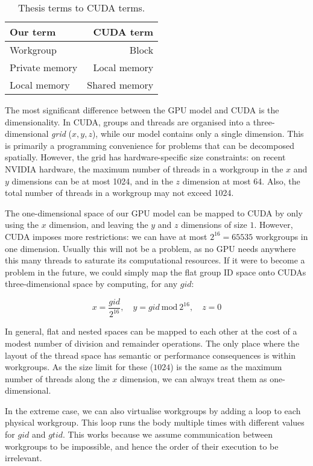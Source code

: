 \begin{table}
  \centering
  \begin{tabular}{l|r}
    \textbf{Our term} & \textbf{CUDA term} \\\hline
    Workgroup & Block \\
    Private memory & Local memory \\
    Local memory & Shared memory
  \end{tabular}
  \caption{Thesis terms to CUDA terms.}
  \label{tab:cuda-terms}
\end{table}

The most significant difference between the GPU model and CUDA is the
dimensionality.  In CUDA, groups and threads are organised into a
three-dimensional \textit{grid} ($x,y,z$), while our model contains
only a single dimension.  This is primarily a programming convenience
for problems that can be decomposed spatially.  However, the grid has
hardware-specific size constraints: on recent NVIDIA hardware, the
maximum number of threads in a workgroup in the $x$ and $y$ dimensions
can be at most 1024, and in the $z$ dimension at most 64.  Also, the
total number of threads in a workgroup may not exceed 1024.

The one-dimensional space of our GPU model can be mapped to CUDA by
only using the $x$ dimension, and leaving the $y$ and $z$ dimensions
of size $1$.  However, CUDA imposes more restrictions: we can have at
most $2^{16}=65535$ workgroups in one dimension.  Usually this will
not be a problem, as no GPU needs anywhere this many threads to
saturate its computational resources.  If it were to become a problem
in the future, we could simply map the flat group ID space onto CUDAs
three-dimensional space by computing, for any $gid$:

\[
x = \frac{gid}{2^{16}},\quad y = gid\ \text{mod}\ 2^{16}, \quad z = 0
\]

In general, flat and nested spaces can be mapped to each other at the
cost of a modest number of division and remainder operations.  The
only place where the layout of the thread space has semantic or
performance consequences is within workgroups.  As the size limit for
these ($1024$) is the same as the maximum number of threads along the
$x$ dimension, we can always treat them as one-dimensional.

In the extreme case, we can also virtualise workgroups by adding a
loop to each physical workgroup.  This loop runs the body multiple
times with different values for $gid$ and $gtid$.  This works because
we assume communication between workgroups to be impossible, and hence
the order of their execution to be irrelevant.


